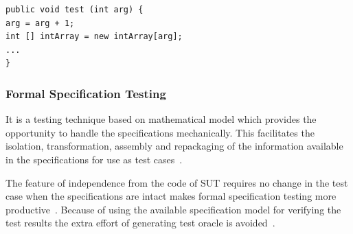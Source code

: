 \begin{lstlisting}
public void test (int arg) {
arg = arg + 1;
int [] intArray = new intArray[arg];
...
}
\end{lstlisting}



\subsubsection{Formal Specification Testing}
It is a testing technique based on mathematical model which provides the opportunity to handle the specifications mechanically. This facilitates the isolation, transformation, assembly and repackaging of the information available in the specifications for use as test cases~\cite{donat1997automating}.

The feature of independence from the code of SUT requires no change in the test case when the specifications are intact makes formal specification testing more productive~\cite{gaudel2010software}. Because of using the available specification model for verifying the test results the extra effort of generating test oracle is avoided~\cite{bertolino2007software}.
  







